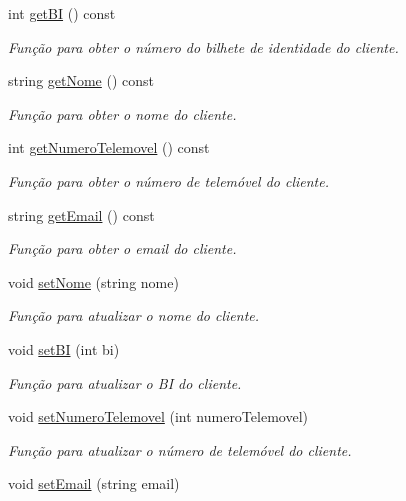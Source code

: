 \begin{DoxyCompactItemize}
int \hyperlink{class_cliente_a800f49dc0761b67a61e563ca9a1478a7}{get\+BI} () const 
\begin{DoxyCompactList}\small\item\em Função para obter o número do bilhete de identidade do cliente. \end{DoxyCompactList}\item 
string \hyperlink{class_cliente_a0325de899469e2fed48ffda2b5b291cf}{get\+Nome} () const 
\begin{DoxyCompactList}\small\item\em Função para obter o nome do cliente. \end{DoxyCompactList}\item 
int \hyperlink{class_cliente_afce876126c623cc00e3c352830eba54c}{get\+Numero\+Telemovel} () const 
\begin{DoxyCompactList}\small\item\em Função para obter o número de telemóvel do cliente. \end{DoxyCompactList}\item 
string \hyperlink{class_cliente_a47c30bc1bd543033fa81ffe25e043e91}{get\+Email} () const 
\begin{DoxyCompactList}\small\item\em Função para obter o email do cliente. \end{DoxyCompactList}\item 
void \hyperlink{class_cliente_a383af20fa7ace06d4f04fe26e82e0ca2}{set\+Nome} (string nome)
\begin{DoxyCompactList}\small\item\em Função para atualizar o nome do cliente. \end{DoxyCompactList}\item 
void \hyperlink{class_cliente_a94b552224f9bb3b3189e2c92282f311f}{set\+BI} (int bi)
\begin{DoxyCompactList}\small\item\em Função para atualizar o BI do cliente. \end{DoxyCompactList}\item 
void \hyperlink{class_cliente_aa82126e31c6e41f79e0063125c80f77c}{set\+Numero\+Telemovel} (int numero\+Telemovel)
\begin{DoxyCompactList}\small\item\em Função para atualizar o número de telemóvel do cliente. \end{DoxyCompactList}\item 
void \hyperlink{class_cliente_a2c44b0f11f5d58b3f5b793a073ed1ac9}{set\+Email} (string email)

\end{DoxyCompactItemize}
